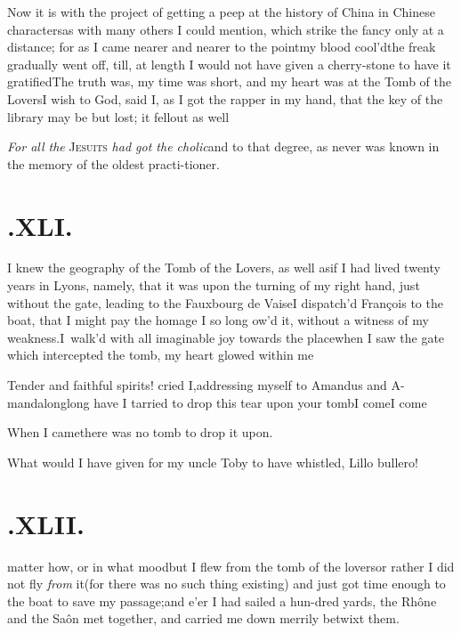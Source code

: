 \documentclass{article}
\begin{document}
Now it is with the project of getting a peep at the history of
China in Chinese characters\tsk as with many others
I could mention, which strike the fancy only at a distance; for as
I came nearer and nearer to the point\tsk my blood
cool’d\tsk the freak gradually went off, till, at length I
would not have given a cherry-stone to have it gratified\tsh The truth was, my time was
short, and my heart was at the Tomb of the Lovers\tsh I
wish to God, said I, as I got the rapper in my hand, that the key
of the library may be but lost; it fell\break out as
well\tsh{}

\textit{For all the} \textsc{Jesuits} \textit{had got the
cholic}\break\tsk and to that degree, as never was known in the
memory of the oldest practi-\break tioner.

\section{.\enspace XLI.}

 I knew the geography of the Tomb of the
Lovers, as well as\break if I had lived twenty years in Lyons, namely,
that it was upon the turning of my right hand, just without the
gate, leading to the Fauxbourg de Vaise\tsk I dispatch’d
François to the boat, that I might pay the homage I so long ow’d
it, without a witness of my weakness.\tsk I~walk’d with all
imaginable joy towards the place\tsk when I saw the gate which
intercepted the tomb, my heart glowed\break
within me\tsh{}

\tsk Tender and faithful spirits! cried I,\break addressing myself
to Amandus and A-\break manda\tsk long\tsk long have I
tarried to drop this tear upon your tomb\tsh I
come\tsh I come\tsh

\vskip -2pt

When I came\tsk there was no tomb to drop it upon.

\vskip -2pt

What would I have given for my uncle Toby to have
whistled, Lillo bullero!

\vskip -2pt

\section{.\enspace XLII.}

 matter how, or in what
mood\tsk\break but I flew from the tomb of the lovers\tsk or rather I
did not fly \textit{from} it\tsk (for there was no such thing
existing) and just got time enough to the boat to save my
passage;\tsk and e’er I had sailed a hun-\break dred yards, the
Rhône and the Saôn met together, and
carried me down merrily betwixt them.\etp{}
\end{document}

